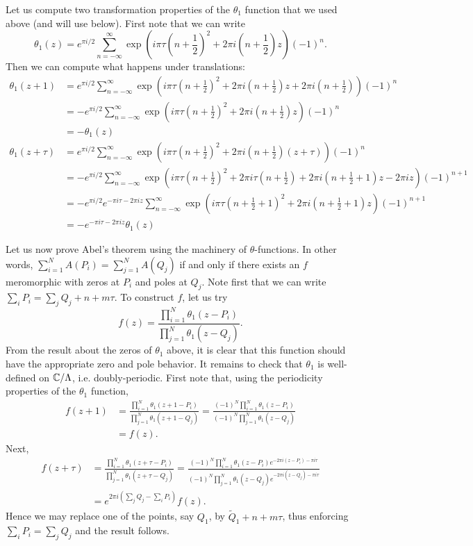 \documentclass{../mathnotes}
\begin{document}
Let us compute two transformation properties of the $\theta_1$ function that we used above (and will use below). First note that we can write
\[\theta_1(z)=e^{\pi i/2}\sum_{n=-\infty}^\infty\exp\left( i\pi\tau(n+\frac{1}{2})^2+2\pi i(n+\frac{1}{2})z \right)(-1)^n.\]
Then we can compute what happens under translations:
\begin{align*}
    \theta_1(z+1)&=e^{\pi i/2}\sum_{n=-\infty}^\infty\exp\left( i\pi\tau(n+\frac{1}{2})^2+2\pi i(n+\frac{1}{2})z +2\pi i(n+\frac{1}{2})\right)(-1)^n\\
    &=-e^{\pi i/2}\sum_{n=-\infty}^\infty\exp\left( i\pi\tau(n+\frac{1}{2})^2+2\pi i(n+\frac{1}{2})z \right)(-1)^n\\
    &=-\theta_1(z)\\
    \theta_1(z+\tau)&=e^{\pi i/2}\sum_{n=-\infty}^\infty\exp\left( i\pi\tau(n+\frac{1}{2})^2+2\pi i(n+\frac{1}{2})(z+\tau) \right)(-1)^n\\
    &=-e^{\pi i/2}\sum_{n=-\infty}^\infty\exp\left( i\pi\tau(n+\frac{1}{2})^2+2\pi i\tau(n+\frac{1}{2})+2\pi i(n+\frac{1}{2}+1)z-2\pi iz \right)(-1)^{n+1}\\
    &=-e^{\pi i/2}e^{-\pi i\tau-2\pi iz}\sum_{n=-\infty}^\infty\exp\left( i\pi\tau(n+\frac{1}{2}+1)^2+2\pi i(n+\frac{1}{2}+1)z\right)(-1)^{n+1}\\
    &=-e^{-\pi i\tau-2\pi i z}\theta_1(z)
\end{align*}


Let us now prove Abel's theorem using the machinery of $\theta$-functions. In other words, $\sum_{i=1}^NA(P_i)=\sum_{j=1}^NA(Q_j)$ if and only if
there exists an $f$ meromorphic with zeros at $P_i$ and poles at $Q_j$. Note first that we can write $\sum_i P_i=\sum_j Q_j+n+m\tau$. To construct
$f$, let us try
\[f(z)=\frac{\prod_{i=1}^N\theta_1(z-P_i)}{\prod_{j=1}^N\theta_1(z-Q_j)}.\]
From the result about the zeros of $\theta_1$ above, it is clear that this function should have the appropriate zero and pole behavior. It remains to
check that $\theta_1$ is well-defined on $\mathbb{C}/\Lambda$, i.e. doubly-periodic. First note that, using the periodicity properties of the $\theta_1$ function,
\begin{align*}
    f(z+1)&=\frac{\prod_{i=1}^N\theta_1(z+1-P_i)}{\prod_{j=1}^N\theta_1(z+1-Q_j)}=\frac{(-1)^N\prod_{i=1}^N\theta_1(z-P_i)}{(-1)^N\prod_{j=1}^N\theta_1(z-Q_j)}\\
    &=f(z).
\end{align*}
Next,
\begin{align*}
    f(z+\tau)&=\frac{\prod_{i=1}^N\theta_1\left( z+\tau-P_i \right)}{\prod_{j=1}^N\theta_1(z+\tau-Q_j)}=\frac{(-1)^N\prod_{i=1}^N\theta_1\left( z-P_i \right)e^{-2\pi i(z-P_i)-\pi i\tau}}{(-1)^N\prod_{j=1}^N\theta_1\left( z-Q_j \right)e^{-2\pi i(z-Q_j)-\pi i\tau}}\\
    &=e^{2\pi i(\sum_j Q_j-\sum_i P_i)}f(z).
\end{align*}
Hence we may replace one of the points, say $Q_1$, by $\tilde Q_1+n+m\tau$, thus enforcing $\sum_i P_i=\sum_jQ_j$ and the result follows.
\end{document}
